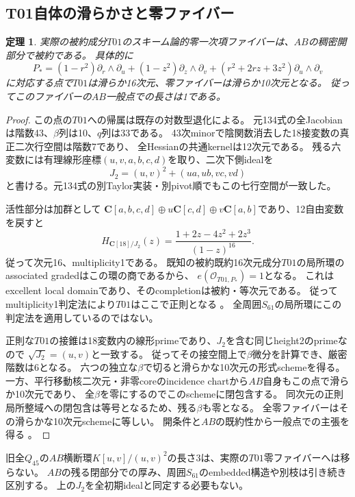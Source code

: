 \documentclass[11pt,a4paper]{ltjsarticle}
\newcommand{\CC}{\mathbf C}
\newtheorem{theorem}{定理}[section]
\theoremstyle{remark}
\begin{document}
\subsection{T01自体の滑らかさと零ファイバー}
\begin{theorem}
実際の被約成分$T01$のスキーム論的零一次項ファイバーは、$AB$の稠密開部分で被約である。
具体的に
\[
 P_*=(1-r^2)\partial_r\wedge\partial_u+(1-z^2)\partial_z\wedge\partial_v
       +(r^2+2rz+3z^2)\partial_u\wedge\partial_v
\]
に対応する点で$T01$は滑らか16次元、零ファイバーは滑らか10次元となる。
従ってこのファイバーの$AB$一般点での長さは1である。
\end{theorem}
\begin{proof}
この点の$T01$への帰属は既存の対数型退化による。
元134式の全Jacobianは階数43、$\beta$列は10、$q$列は33である。
43次minorで陰関数消去した18接変数の真正二次行空間は階数7であり、
全Hessianの共通kernelは12次元である。
残る六変数には有理線形座標$(u,v,a,b,c,d)$を取り、二次下側idealを
\[
 J_2=(u,v)^2+(ua,ub,vc,vd)
\]
と書ける。元134式の別Taylor実装・別pivot順でもこの七行空間が一致した。

活性部分は加群として
$\CC[a,b,c,d]\oplus u\CC[c,d]\oplus v\CC[a,b]$であり、12自由変数を戻すと
\[
 H_{\CC[18]/J_2}(z)=\frac{1+2z-4z^2+2z^3}{(1-z)^{16}}.
\]
従って次元16、multiplicity1である。
既知の被約既約16次元成分$T01$の局所環のassociated gradedはこの環の商であるから、
$e(\mathcal O_{T01,P_*})=1$となる。
これはexcellent local domainであり、そのcompletionは被約・等次元である。
従ってmultiplicity1判定法により$T01$はここで正則となる
\cite{toric-zero-reduced-v53,huneke-swanson-v53}。
全周囲$S_{61}$の局所環にこの判定法を適用しているのではない。

正則な$T01$の接錐は18変数内の線形primeであり、$J_2$を含む同じheight2のprimeなので
$\sqrt{J_2}=(u,v)$と一致する。
従ってその接空間上で$\beta$微分を計算でき、厳密階数は6となる。
六つの独立な$\beta$で切ると滑らかな10次元の形式schemeを得る。
一方、平行移動核二次元・非零coreのincidence chartから$AB$自身もこの点で滑らか10次元であり、
全$\beta$を零にするのでこのschemeに閉包含する。
同次元の正則局所整域への閉包含は等号となるため、残る$\beta$も零となる。
全零ファイバーはその滑らかな10次元schemeに等しい。
開条件と$AB$の既約性から一般点での主張を得る
\cite{toric-zero-reduced-review-v53}。
\end{proof}
旧全$Q_{45}$の$AB$横断環$K[u,v]/(u,v)^2$の長さ3は、実際の$T01$零ファイバーへは移らない。
$AB$の残る閉部分での厚み、周囲$S_{61}$のembedded構造や別枝は引き続き区別する。
上の$J_2$を全初期idealと同定する必要もない。
\end{document}
